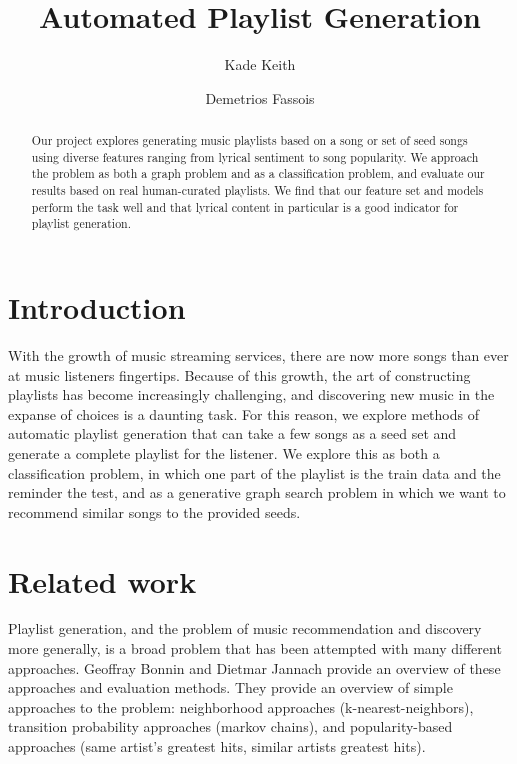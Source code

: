 \documentclass[acmtog]{acmart}
\begin{document}
\title{Automated Playlist Generation}

\author{Kade Keith}
\author{Demetrios Fassois}

\begin{abstract}
Our project explores generating music playlists based on a song or set of seed songs using diverse features ranging from lyrical sentiment to song popularity. We approach the problem as both a graph problem and as a classification problem, and evaluate our results based on real human-curated playlists. We find that our feature set and models perform the task well and that lyrical content in particular is a good indicator for playlist generation.
\end{abstract}

\maketitle
\thispagestyle{empty}

\section{Introduction}

With the growth of music streaming services, there are now more songs than ever at music listeners fingertips. Because of this growth, the art of constructing playlists has become increasingly challenging, and discovering new music in the expanse of choices is a daunting task. For this reason, we explore methods of automatic playlist generation that can take a few songs as a seed set and generate a complete playlist for the listener. We explore this as both a classification problem, in which one part of the playlist is the train data and the reminder the test, and as a  generative graph search problem in which we want to recommend similar songs to the provided seeds.

\section{Related work}

Playlist generation, and the problem of music recommendation and discovery more generally, is a broad problem that has been attempted with many different approaches. Geoffray Bonnin and Dietmar Jannach \cite{Bonnin2013ACO} provide an overview of these approaches and evaluation methods. They provide an overview of simple approaches to the problem: neighborhood approaches (k-nearest-neighbors), transition probability approaches (markov chains), and popularity-based approaches (same artist's greatest hits, similar artists greatest hits).
\end{document}
